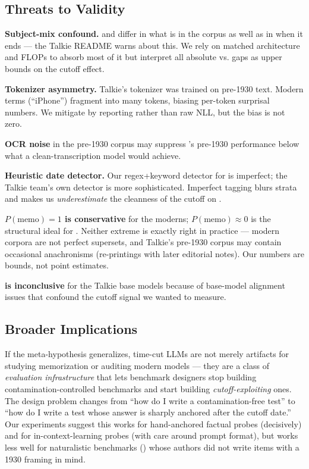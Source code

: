 \subsection{Threats to Validity}

\textbf{Subject-mix confound.} \talkienineteen and \talkieweb differ in what is in the corpus as well as in when it ends --- the Talkie README warns about this. We rely on matched architecture and FLOPs to absorb most of it but interpret all absolute \talkienineteen vs. \talkieweb gaps as upper bounds on the cutoff effect.

\textbf{Tokenizer asymmetry.} Talkie's tokenizer was trained on pre-1930 text. Modern terms (\eg ``iPhone'') fragment into many tokens, biasing per-token surprisal numbers. We mitigate by reporting \bpt rather than raw NLL, but the bias is not zero.

\textbf{OCR noise} in the pre-1930 corpus may suppress \talkienineteen's pre-1930 performance below what a clean-transcription model would achieve.

\textbf{Heuristic date detector.} Our regex+keyword detector for \mmlu is imperfect; the Talkie team's own detector is more sophisticated. Imperfect tagging blurs strata and makes us \emph{underestimate} the cleanness of the cutoff on \mmlu.

\textbf{$P(\text{memo}) = 1$ is conservative} for the moderns; $P(\text{memo}) \approx 0$ is the structural ideal for \talkienineteen. Neither extreme is exactly right in practice --- modern corpora are not perfect supersets, and Talkie's pre-1930 corpus may contain occasional anachronisms (\eg re-printings with later editorial notes). Our numbers are bounds, not point estimates.

\textbf{\humaneval is inconclusive} for the Talkie base models because of base-model alignment issues that confound the cutoff signal we wanted to measure.

\subsection{Broader Implications}

If the meta-hypothesis generalizes, time-cut LLMs are not merely artifacts for studying memorization or auditing modern models --- they are a class of \emph{evaluation infrastructure} that lets benchmark designers stop building contamination-controlled benchmarks and start building \emph{cutoff-exploiting} ones. The design problem changes from ``how do I write a contamination-free test'' to ``how do I write a test whose answer is sharply anchored after the cutoff date.'' Our experiments suggest this works for hand-anchored factual probes (decisively) and for in-context-learning probes (with care around prompt format), but works less well for naturalistic benchmarks (\mmlu) whose authors did not write items with a 1930 framing in mind.
